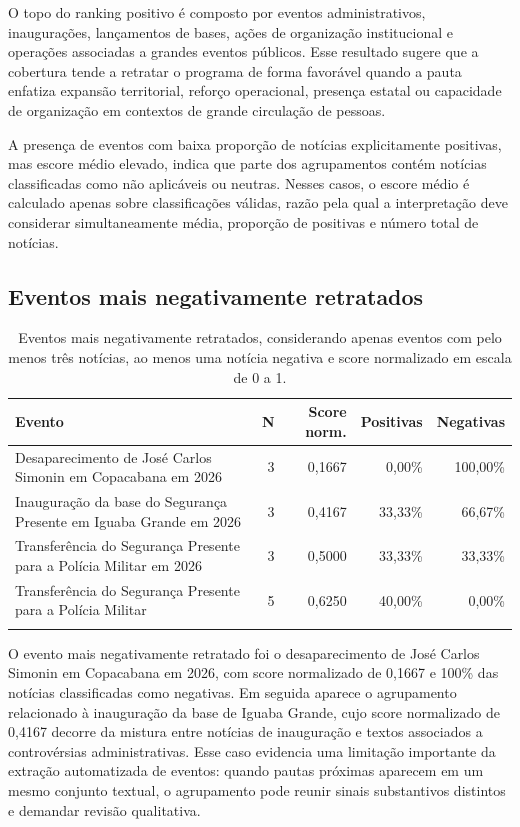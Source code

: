 \documentclass[12pt,a4paper]{article}
\begin{document}
O topo do ranking positivo é composto por eventos administrativos, inaugurações, lançamentos de bases, ações de organização institucional e operações associadas a grandes eventos públicos. Esse resultado sugere que a cobertura tende a retratar o programa de forma favorável quando a pauta enfatiza expansão territorial, reforço operacional, presença estatal ou capacidade de organização em contextos de grande circulação de pessoas.

A presença de eventos com baixa proporção de notícias explicitamente positivas, mas escore médio elevado, indica que parte dos agrupamentos contém notícias classificadas como não aplicáveis ou neutras. Nesses casos, o escore médio é calculado apenas sobre classificações válidas, razão pela qual a interpretação deve considerar simultaneamente média, proporção de positivas e número total de notícias.

\subsection{Eventos mais negativamente retratados}

\begin{longtable}{p{7.2cm}rrrr}
\toprule
\textbf{Evento} & \textbf{N} & \textbf{Score norm.} & \textbf{Positivas} & \textbf{Negativas} \\
\midrule
\endhead
Desaparecimento de José Carlos Simonin em Copacabana em 2026 & 3 & 0,1667 & 0,00\% & 100,00\% \\
Inauguração da base do Segurança Presente em Iguaba Grande em 2026 & 3 & 0,4167 & 33,33\% & 66,67\% \\
Transferência do Segurança Presente para a Polícia Militar em 2026 & 3 & 0,5000 & 33,33\% & 33,33\% \\
Transferência do Segurança Presente para a Polícia Militar & 5 & 0,6250 & 40,00\% & 0,00\% \\
\bottomrule
\caption{Eventos mais negativamente retratados, considerando apenas eventos com pelo menos três notícias, ao menos uma notícia negativa e score normalizado em escala de 0 a 1.}
\end{longtable}

O evento mais negativamente retratado foi o desaparecimento de José Carlos Simonin em Copacabana em 2026, com score normalizado de 0,1667 e 100\% das notícias classificadas como negativas. Em seguida aparece o agrupamento relacionado à inauguração da base de Iguaba Grande, cujo score normalizado de 0,4167 decorre da mistura entre notícias de inauguração e textos associados a controvérsias administrativas. Esse caso evidencia uma limitação importante da extração automatizada de eventos: quando pautas próximas aparecem em um mesmo conjunto textual, o agrupamento pode reunir sinais substantivos distintos e demandar revisão qualitativa.
\end{document}
